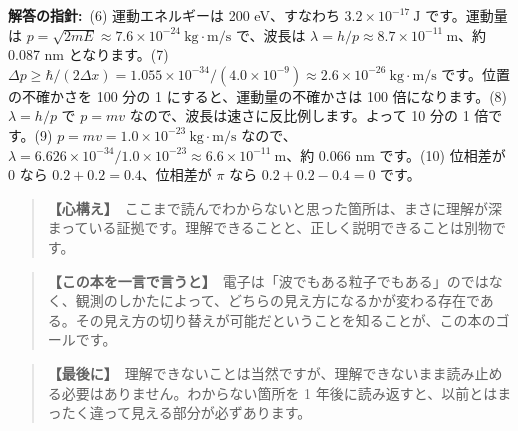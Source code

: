 \documentclass{article}
\begin{document}
\textbf{解答の指針:}\ (6) 運動エネルギーは 200 eV、すなわち \( 3.2 \times 10^{-17} \ \mathrm{J} \) です。運動量は \( p = \sqrt{2 m E} \approx 7.6 \times 10^{-24} \ \mathrm{kg \cdot m/s} \) で、波長は \( \lambda = h / p \approx 8.7 \times 10^{-11} \ \mathrm{m} \)、約 0.087 nm となります。(7) \( \Delta p \ge \hbar / (2 \Delta x) = 1.055 \times 10^{-34} / (4.0 \times 10^{-9}) \approx 2.6 \times 10^{-26} \ \mathrm{kg \cdot m/s} \) です。位置の不確かさを 100 分の 1 にすると、運動量の不確かさは 100 倍になります。(8) \( \lambda = h / p \) で \(p = mv\) なので、波長は速さに反比例します。よって 10 分の 1 倍です。(9) \( p = mv = 1.0 \times 10^{-23} \ \mathrm{kg \cdot m/s} \) なので、\(\lambda = 6.626 \times 10^{-34} / 1.0 \times 10^{-23} \approx 6.6 \times 10^{-11} \ \mathrm{m}\)、約 0.066 nm です。(10) 位相差が 0 なら \( 0.2 + 0.2 = 0.4 \)、位相差が \(\pi\) なら \( 0.2 + 0.2 - 0.4 = 0 \) です。

\begin{quote}
\textbf{【心構え】}\ ここまで読んでわからないと思った箇所は、まさに理解が深まっている証拠です。理解できることと、正しく説明できることは別物です。
\end{quote}

\begin{quote}
\textbf{【この本を一言で言うと】}\ 電子は「波でもある粒子でもある」のではなく、観測のしかたによって、どちらの見え方になるかが変わる存在である。その見え方の切り替えが可能だということを知ることが、この本のゴールです。
\end{quote}

\begin{quote}
\textbf{【最後に】}\ 理解できないことは当然ですが、理解できないまま読み止める必要はありません。わからない箇所を 1 年後に読み返すと、以前とはまったく違って見える部分が必ずあります。
\end{quote}
\end{document}
